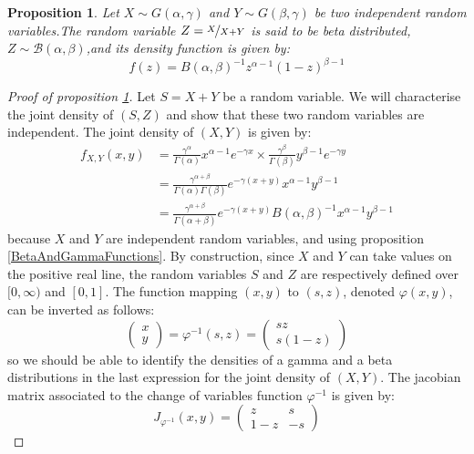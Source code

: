 \documentclass{amsart}
\theoremstyle{plain}
\newtheorem{proposition}{Proposition}[section]
\theoremstyle{remark}
\numberwithin{equation}{section}
\begin{document}
\begin{proposition}\label{BetaDensity}
  Let $X\sim G(\alpha, \gamma)$ and $Y\sim G(\beta, \gamma)$ be two independent
  random variables.The random variable $Z = \nicefrac{X}{X+Y}$ is said
  to be beta distributed, $Z\sim \mathcal B(\alpha,\beta)$,and its
  density function is given by:
  \[
    f(z)=B(\alpha,\beta)^{-1}z^{\alpha-1}(1-z)^{\beta-1}
  \]
\end{proposition}

\begin{proof}[Proof of proposition \ref{BetaDensity}]
  Let $S = X+Y$ be a random variable. We will characterise the joint
  density of $(S,Z)$ and show that these two random variables are
  independent. The joint density of $(X,Y)$ is given by:
  \[
    \begin{split}
      f_{X,Y}(x,y) &= \frac{\gamma^{\alpha}}{\Gamma(\alpha)}x^{\alpha-1}e^{-\gamma x} \times \frac{\gamma^{\beta}}{\Gamma(\beta)}y^{\beta-1}e^{-\gamma y}\\
      &= \frac{\gamma^{\alpha+\beta}}{\Gamma(\alpha)\Gamma(\beta)}e^{-\gamma (x+y)}x^{\alpha-1}y^{\beta-1}\\
      &= \frac{\gamma^{\alpha+\beta}}{\Gamma(\alpha+\beta)}e^{-\gamma (x+y)}B(\alpha,\beta)^{-1}x^{\alpha-1}y^{\beta-1}
    \end{split}
  \]
  because $X$ and $Y$ are independent random variables, and using proposition \ref{BetaAndGammaFunctions}. By
  construction, since $X$ and $Y$ can take values on the positive real
  line, the random variables $S$ and $Z$ are respectively defined over
  $[0,\infty)$ and $[0,1]$. The function mapping $(x,y)$ to $(s,z)$,
  denoted $\varphi(x,y)$, can be inverted as follows:
  \[
    \begin{pmatrix}
      x\\
      y
    \end{pmatrix}
    =
    \varphi^{-1}(s,z)
    =
    \begin{pmatrix}
      sz\\
      s(1-z)
    \end{pmatrix}
  \]
  so we should be able to identify the densities of a gamma and a beta
  distributions in the last expression for the joint density of
  $(X, Y)$. The jacobian matrix associated to the change of variables
  function $\varphi^{-1}$ is given by:
  \[
    J_{\varphi^{-1}}(x,y) =
    \begin{pmatrix}
      z & s \\
      1-z & -s
    \end{pmatrix}
\]
\end{proof}
\end{document}
